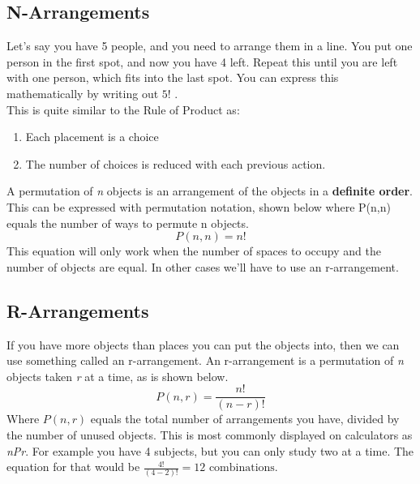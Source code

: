     \subsection{N-Arrangements}
    Let's say you have 5 people, and you need to arrange them in a line.
    You put one person in the first spot, and now you have 4 left. Repeat this until you are left with one person, which fits into the last spot.
    You can express this mathematically by writing out $5!$ .\\
    This is quite similar to the Rule of Product as:
    \begin{enumerate}
        \item Each placement is a choice
        \item The number of choices is reduced with each previous action. 
    \end{enumerate}
    A permutation of \emph{n} objects is an arrangement of the objects in a \textbf{definite order}.
    This can be expressed with permutation notation, shown below where P(n,n) equals the number of ways to permute n objects.
    \begin{equation*}
        P(n,n) = n!
    \end{equation*}
    This equation will only work when the number of spaces to occupy and the number of objects are equal.
    In other cases we'll have to use an r-arrangement.
    
    \subsection{R-Arrangements}
    If you have more objects than places you can put the objects into, then we can use something called an r-arrangement.
    An r-arrangement is a permutation of \emph{n} objects taken \emph{r} at a time, as is shown below.
    \begin{equation*}
       P(n,r) = \frac{n!}{(n-r)!} 
    \end{equation*}
    Where $P(n,r)$ equals the total number of arrangements you have, divided by the number of unused objects.
    This is most commonly displayed on calculators as \emph{nPr}.
    For example you have 4 subjects, but you can only study two at a time.
    The equation for that would be $\frac{4!}{(4-2)!}=12\mbox{ combinations.}$ 
    
